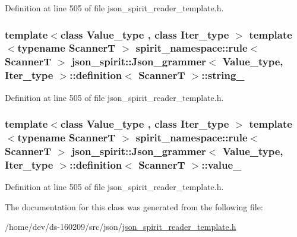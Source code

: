 Definition at line 505 of file json\+\_\+spirit\+\_\+reader\+\_\+template.\+h.

\hypertarget{classjson__spirit_1_1_json__grammer_1_1definition_a0f8f712ca15aba3f388c5ca4e7a5fd07}{}
\subsubsection[{string\+\_\+}]{\setlength{\rightskip}{0pt plus 5cm}template$<$class Value\+\_\+type , class Iter\+\_\+type $>$ template$<$typename Scanner\+T $>$ spirit\+\_\+namespace\+::rule$<$ Scanner\+T $>$ {\bf json\+\_\+spirit\+::\+Json\+\_\+grammer}$<$ {\bf Value\+\_\+type}, Iter\+\_\+type $>$\+::{\bf definition}$<$ Scanner\+T $>$\+::string\+\_\+}\label{classjson__spirit_1_1_json__grammer_1_1definition_a0f8f712ca15aba3f388c5ca4e7a5fd07}


Definition at line 505 of file json\+\_\+spirit\+\_\+reader\+\_\+template.\+h.

\hypertarget{classjson__spirit_1_1_json__grammer_1_1definition_aef39f18976abab0f07c8cc52379ab7aa}{}
\subsubsection[{value\+\_\+}]{\setlength{\rightskip}{0pt plus 5cm}template$<$class Value\+\_\+type , class Iter\+\_\+type $>$ template$<$typename Scanner\+T $>$ spirit\+\_\+namespace\+::rule$<$ Scanner\+T $>$ {\bf json\+\_\+spirit\+::\+Json\+\_\+grammer}$<$ {\bf Value\+\_\+type}, Iter\+\_\+type $>$\+::{\bf definition}$<$ Scanner\+T $>$\+::value\+\_\+}\label{classjson__spirit_1_1_json__grammer_1_1definition_aef39f18976abab0f07c8cc52379ab7aa}


Definition at line 505 of file json\+\_\+spirit\+\_\+reader\+\_\+template.\+h.



The documentation for this class was generated from the following file\+:\begin{DoxyCompactItemize}
\item 
/home/dev/ds-\/160209/src/json/\hyperlink{json__spirit__reader__template_8h}{json\+\_\+spirit\+\_\+reader\+\_\+template.\+h}\end{DoxyCompactItemize}
